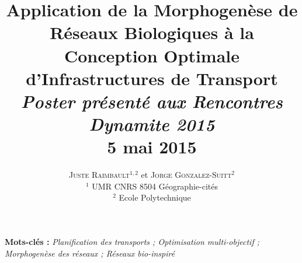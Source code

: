 \documentclass[11pt]{article}
\newcommand{\noun}[1]{\textsc{#1}}
\begin{document}
\title{Application de la Morphogen{\`e}se de R{\'e}seaux Biologiques {\`a} la Conception Optimale d’Infrastructures de Transport
\bigskip\bigskip\\
\textit{Poster pr{\'e}sent{\'e} aux Rencontres Dynamite 2015}
\medskip\\5 mai 2015
}
\author{\noun{Juste Raimbault}$^{1,2}$ et \noun{Jorge Gonzalez-Suitt}$^{2}$\medskip\\
$^1$ UMR CNRS 8504 Géographie-cités\\
$^2$ Ecole Polytechnique\\
}
\date{}

\maketitle

\justify





\textbf{Mots-clés : }\textit{Planification des transports ; Optimisation multi-objectif ; Morphogen{\`e}se des réseaux ; Réseaux bio-inspiré}
\end{document}
